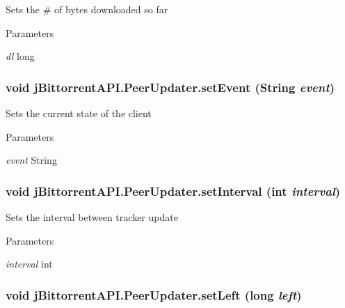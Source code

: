 \label{classj_bittorrent_a_p_i_1_1_peer_updater_a2e61605bc665ddcbd7eb27818e736757}
Sets the \# of bytes downloaded so far 
\begin{DoxyParams}{Parameters}
\item[{\em dl}]long \end{DoxyParams}
\hypertarget{classj_bittorrent_a_p_i_1_1_peer_updater_ae34cb08d19d949f34eb0cc328e2d40f6}{
\subsubsection[{setEvent}]{\setlength{\rightskip}{0pt plus 5cm}void jBittorrentAPI.PeerUpdater.setEvent (String {\em event})}}
\label{classj_bittorrent_a_p_i_1_1_peer_updater_ae34cb08d19d949f34eb0cc328e2d40f6}
Sets the current state of the client 
\begin{DoxyParams}{Parameters}
\item[{\em event}]String \end{DoxyParams}
\hypertarget{classj_bittorrent_a_p_i_1_1_peer_updater_addc5a75c5178250e19a15bb1697f8789}{
\subsubsection[{setInterval}]{\setlength{\rightskip}{0pt plus 5cm}void jBittorrentAPI.PeerUpdater.setInterval (int {\em interval})}}
\label{classj_bittorrent_a_p_i_1_1_peer_updater_addc5a75c5178250e19a15bb1697f8789}
Sets the interval between tracker update 
\begin{DoxyParams}{Parameters}
\item[{\em interval}]int \end{DoxyParams}
\hypertarget{classj_bittorrent_a_p_i_1_1_peer_updater_aec85a3a1ec6776a6a1c90189cd233e55}{
\subsubsection[{setLeft}]{\setlength{\rightskip}{0pt plus 5cm}void jBittorrentAPI.PeerUpdater.setLeft (long {\em left})}}
\label{classj_bittorrent_a_p_i_1_1_peer_updater_aec85a3a1ec6776a6a1c90189cd233e55}
